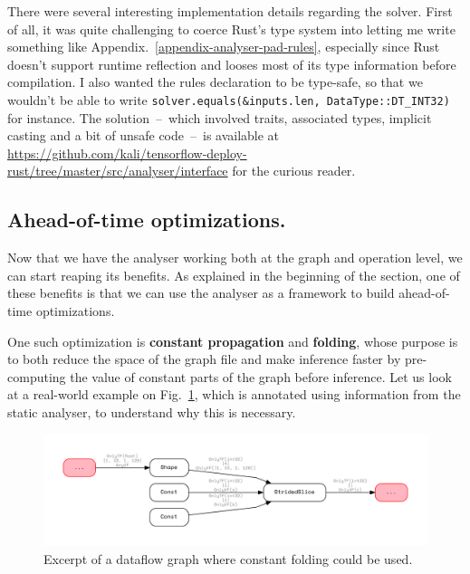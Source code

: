 \documentclass[11pt]{article}
\begin{document}
There were several interesting implementation details regarding the solver. First of all, it was quite challenging to coerce Rust's type system into letting me write something like Appendix.~\ref{appendix-analyser-pad-rules}, especially since Rust doesn't support runtime reflection and looses most of its type information before compilation. I also wanted the rules declaration to be type-safe, so that we wouldn't be able to write \texttt{solver.equals(&inputs.len, DataType::DT_INT32)} for instance. The solution~--~which involved traits, associated types, implicit casting and a bit of unsafe code~--~is available at \url{https://github.com/kali/tensorflow-deploy-rust/tree/master/src/analyser/interface} for the curious reader.

\subsection{Ahead-of-time optimizations.}

Now that we have the analyser working both at the graph and operation level, we can start reaping its benefits. As explained in the beginning of the section, one of these benefits is that we can use the analyser as a framework to build ahead-of-time optimizations.

One such optimization is \textbf{constant propagation} and \textbf{folding}, whose purpose is to both reduce the space of the graph file and make inference faster by pre-computing the value of constant parts of the graph before inference. Let us look at a real-world example on Fig.~\ref{fig-constant-propagation}, which is annotated using information from the static analyser, to understand why this is necessary.

\begin{figure}[!h]
\centering
    \caption{Excerpt of a dataflow graph where constant folding could be used.}
    \label{fig-constant-propagation}
    \vspace{-1.5em}
    \hspace*{-6.4em}
    \includegraphics[width=1.3\textwidth]{constant-propagation.pdf}
    \vspace{-3.5em}
\end{figure}
\end{document}
